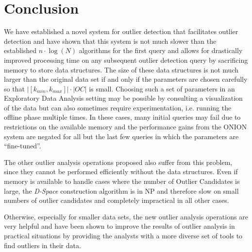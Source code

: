 \documentclass[runningheads]{llncs}
\begin{document}
\section{Conclusion}
We have established a novel system for outlier detection that facilitates outlier detection and have shown that this system is not much slower than the established $n\cdot \log(N)$ algorithms for the first query and allows for drastically improved processing time on any subsequent outlier detection query by sacrificing memory to store data structures. The size of these data structures is not much larger than the original data set if and only if the parameters are chosen carefully so that $|[k_{min},k_{max}]| \cdot |OC|$ is small. Choosing such a set of parameters in an Exploratory Data Analysis setting may be possible by consulting a visualization of the data but can also sometimes require experimentation, i.e. running the offline phase multiple times. In these cases, many initial queries may fail due to restrictions on the available memory and the performance gains from the ONION system are negated for all but the last few queries in which the parameters are ``fine-tuned''. 

The other outlier analysis operations proposed also suffer from this problem, since they cannot be performed efficiently without the data structures. Even if memory is available to handle cases where the number of Outlier Candidates is large, the \emph{D-Space} construction algorithm is in NP and therefore slow on small numbers of outlier candidates and completely impractical in all other cases.

Otherwise, especially for smaller data sets, the new outlier analysis operations are very helpful and have been shown\cite{onion} to improve the results of outlier analysis in practical situations by providing the analysts with a more diverse set of tools to find outliers in their data.

%


  
\end{document}
